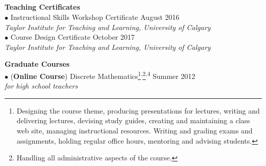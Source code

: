 \documentclass[margin,line,pifont,palatino,courier]{res}
\begin{document}
\begin{resume}
\section{} 
\begin{description}
	\item \textbf{Teaching Certificates}\\
		$\bullet$ Instructional Skills Workshop Certificate \hfill August 2016 \\
		\phantom{----} {\sl \small{Taylor Institute for Teaching and Learning, University of Calgary}}\\
		$\bullet$ Course Design Certificate \hfill October 2017 \\
		\phantom{----} {\sl \small{Taylor Institute for Teaching and Learning, University of Calgary}}

	\item \textbf{Graduate Courses}\\
		$\bullet$ (\textbf{Online Course}) Discrete Mathematics\footnote{Designing the course theme, producing presentations for lectures, writing and delivering lectures, devising study guides, creating and maintaining a class web site, managing instructional resources. Writing and grading exams and assignments, holding regular office hours, mentoring and advising students.}\textsuperscript{,}\footnote{Handling all administrative aspects of the course.}\textsuperscript{,$4$} \hfill Summer 2012\\
		\phantom{----}\textit{for high school teachers}



\end{description}
\end{resume}
\end{document}
